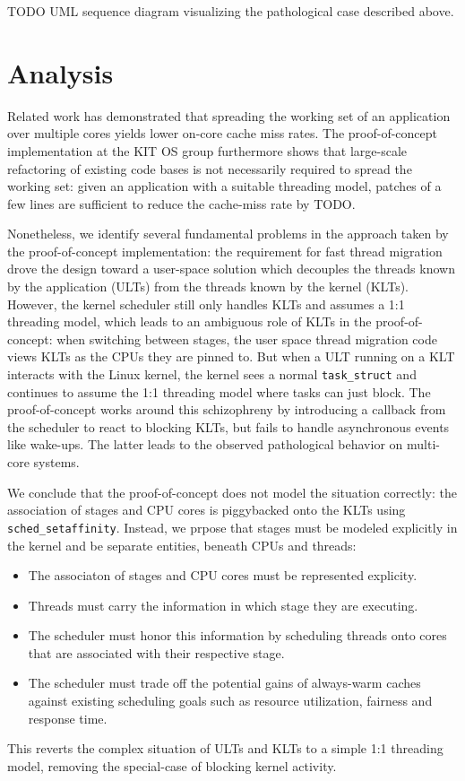 \documentclass[12pt,a4paper]{book}
\begin{document}
TODO UML sequence diagram visualizing the pathological case described above.

\chapter{Analysis}\label{ch:analysis}
Related work has demonstrated that spreading the working set of an application over multiple cores yields lower on-core cache miss rates.
The proof-of-concept implementation at the KIT OS group furthermore shows that large-scale refactoring of existing code bases is not necessarily required to spread the working set:
given an application with a suitable threading model, patches of a few lines are sufficient to reduce the cache-miss rate by TODO.

Nonetheless, we identify several fundamental problems in the approach taken by the proof-of-concept implementation:
the requirement for fast thread migration drove the design toward a user-space solution which decouples the threads known by the application (ULTs) from the threads known by the kernel (KLTs).
However, the kernel scheduler still only handles KLTs and assumes a 1:1 threading model, which leads to an ambiguous role of KLTs in the proof-of-concept:
when switching between stages, the user space thread migration code views KLTs as the CPUs they are pinned to.
But when a ULT running on a KLT interacts with the Linux kernel, the kernel sees a normal \texttt{task\_struct} and continues to assume the 1:1 threading model where tasks can just block.
The proof-of-concept works around this schizophreny by introducing a callback from the scheduler to react to blocking KLTs, but fails to handle asynchronous events like wake-ups.
The latter leads to the observed pathological behavior on multi-core systems.

We conclude that the proof-of-concept does not model the situation correctly: the association of stages and CPU cores is piggybacked onto the KLTs using \texttt{sched\_setaffinity}.
Instead, we prpose that stages must be modeled explicitly in the kernel and be separate entities, beneath CPUs and threads:
\begin{itemize}%
    \item The associaton of stages and CPU cores must be represented explicity.
    \item Threads must carry the information in which stage they are executing.
    \item The scheduler must honor this information by scheduling threads onto cores that are associated with their respective stage.
    \item The scheduler must trade off the potential gains of always-warm caches against existing scheduling goals such as resource utilization, fairness and response time.
\end{itemize}%
This reverts the complex situation of ULTs and KLTs to a simple 1:1 threading model, removing the special-case of blocking kernel activity.
\end{document}
